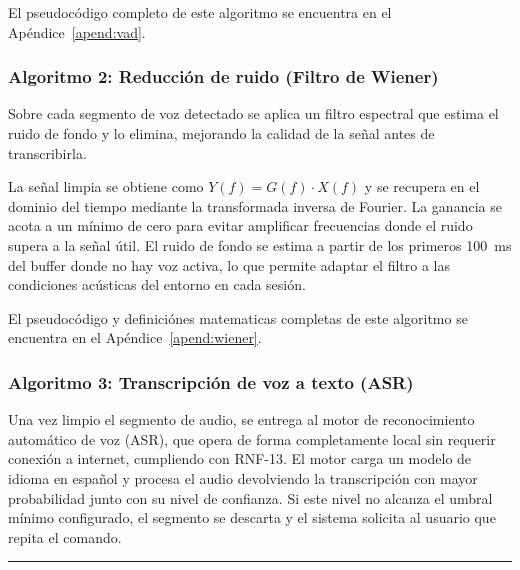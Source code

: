 El pseudocódigo completo de este algoritmo se encuentra en el
Apéndice~\ref{apend:vad}.

\subsubsection{Algoritmo 2: Reducción de ruido (Filtro de Wiener)}

Sobre cada segmento de voz detectado se aplica un filtro espectral que estima el ruido
de fondo y lo elimina, mejorando la calidad de la señal antes de transcribirla.

La señal limpia se obtiene como $Y(f) = G(f) \cdot X(f)$ y se recupera en el dominio
del tiempo mediante la transformada inversa de Fourier. La ganancia se acota
a un mínimo de cero para evitar amplificar frecuencias donde el ruido supera a la
señal útil. El ruido de fondo se estima a partir de los primeros 100~ms del buffer
donde no hay voz activa, lo que permite adaptar el filtro a las condiciones acústicas
del entorno en cada sesión.

El pseudocódigo y definiciónes matematicas completas de este algoritmo se encuentra en el
Apéndice~\ref{apend:wiener}.

\subsubsection{Algoritmo 3: Transcripción de voz a texto (ASR)}

Una vez limpio el segmento de audio, se entrega al motor de reconocimiento automático
de voz (ASR), que opera de forma completamente local sin requerir conexión a internet,
cumpliendo con RNF-13. El motor carga un modelo de idioma en español y procesa el
audio devolviendo la transcripción con mayor probabilidad junto con su nivel de
confianza. Si este nivel no alcanza el umbral mínimo configurado, el segmento se
descarta y el sistema solicita al usuario que repita el comando.

\begin{center}
\label{alg:asr}
\end{center}
\vspace{-1.8cm}
\rule{\textwidth}{0.4pt}
\vspace{-0.9cm}

